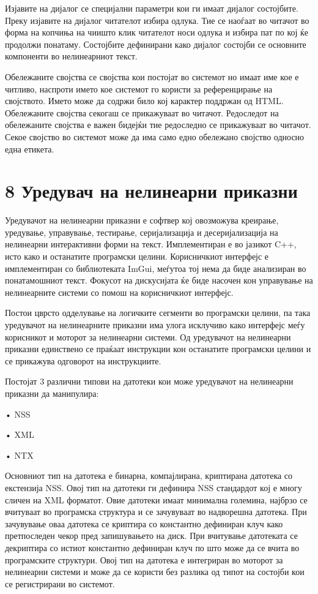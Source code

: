 Изјавите на дијалог се специјални параметри кои ги имаат дијалог состојбите. Преку изјавите на дијалог читателот избира одлука. Тие се наоѓаат во читачот во форма на копчиња на чиишто клик читателот носи одлука и избира пат по кој ќе продолжи понатаму. Состојбите дефинирани како дијалог состојби се основните компоненти во нелинеарниот текст.

Обележаните својства се својства кои постојат во системот но имаат име кое е читливо, наспроти името кое системот го користи за референцирање на својството. Името може да содржи било кој карактер поддржан од HTML. Обележаните својства секогаш се прикажуваат во читачот. Редоследот на обележаните својства е важен бидејќи тие редоследно се прикажуваат во читачот. Секое својство во системот може да има само едно обележано својство односно една етикета.

\section{8 Уредувач на нелинеарни приказни}

Уредувачот на нелинеарни приказни е софтвер кој овозможува креирање, уредување, управување, тестирање, серијализација и десеријализација на нелинеарни интерактивни форми на текст. Имплементиран е во јазикот C++, исто како и останатите програмски целини. Корисничкиот интерфејс е имплементиран со библиотеката ImGui, меѓутоа тој нема да биде анализиран во понатамошниот текст. Фокусот на дискусијата ќе биде насочен кон управување на нелинеарните системи со помош на корисничкиот интерфејс.

Постои цврсто одделување на логичките сегменти во програмски целини, па така уредувачот на нелинеарните приказни има улога исклучиво како интерфејс меѓу корисникот и моторот за нелинеарни системи. Од уредувачот на нелинеарни приказни единствено се праќаат инструкции кон останатите програмски целини и се прикажува одговорот на инструкциите.

Постојат 3 различни типови на датотеки кои може уредувачот на нелинеарни приказни да манипулира:

• NSS

• XML

• NTX

Основниот тип на датотека е бинарна, компајлирана, криптирана датотека со екстензија NSS. Овој тип на датотеки ги дефинира NSS стандардот кој е многу сличен на XML форматот. Овие датотеки имаат минимална големина, најбрзо се вчитуваат во програмска структура и се зачувуваат во надворешна датотека. При зачувување оваа датотека се криптира со константно дефиниран клуч како претпоследен чекор пред запишувањето на диск. При вчитување датотеката се декриптира со истиот константно дефиниран клуч по што може да се вчита во програмските структури. Овој тип на датотека е интегриран во моторот за нелинеарни системи и може да се користи без разлика од типот на состојби кои се регистрирани во системот.



